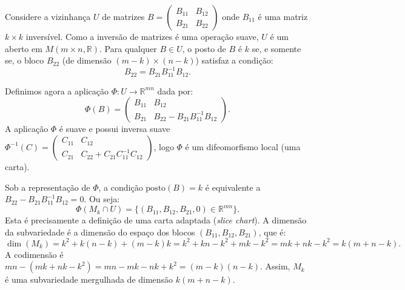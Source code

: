 {	Considere a vizinhança $U$ de matrizes $B = \begin{pmatrix} B_{11} & B_{12} \\ B_{21} & B_{22} \end{pmatrix}$ onde $B_{11}$ é uma matriz $k \times k$ inversível. Como a inversão de matrizes é uma operação suave, $U$ é um aberto em $M(m \times n, \mathbb{R})$. 
	Para qualquer $B \in U$, o posto de $B$ é $k$ se, e somente se, o bloco $B_{22}$ (de dimensão $(m-k) \times (n-k)$) satisfaz a condição:
	\begin{equation*}
		B_{22} = B_{21} B_{11}^{-1} B_{12}.
	\end{equation*}
	
	Definimos agora a aplicação $\Phi : U \to \mathbb{R}^{mn}$ dada por:
	\begin{equation*}
		\Phi(B) = \begin{pmatrix} B_{11} & B_{12} \\ B_{21} & B_{22} - B_{21} B_{11}^{-1} B_{12} \end{pmatrix}.
	\end{equation*}
	A aplicação $\Phi$ é suave e possui inversa suave $\Phi^{-1}(C) = \begin{pmatrix} C_{11} & C_{12} \\ C_{21} & C_{22} + C_{21} C_{11}^{-1} C_{12} \end{pmatrix}$, logo $\Phi$ é um difeomorfismo local (uma carta).
	
	Sob a representação de $\Phi$, a condição $\text{posto}(B) = k$ é equivalente a $B_{22} - B_{21} B_{11}^{-1} B_{12} = 0$. Ou seja:
	\begin{equation*}
		\Phi(M_k \cap U) = \{ (B_{11}, B_{12}, B_{21}, 0) \in \mathbb{R}^{mn} \}.
	\end{equation*}
	Esta é precisamente a definição de uma carta adaptada (\textit{slice chart}). A dimensão da subvariedade é a dimensão do espaço dos blocos $(B_{11}, B_{12}, B_{21})$, que é:
	\begin{equation*}
		\dim(M_k) = k^2 + k(n-k) + (m-k)k = k^2 + kn - k^2 + mk - k^2 = mk + nk - k^2 = k(m+n-k).
	\end{equation*}
	A codimensão é $mn - (mk + nk - k^2) = mn - mk - nk + k^2 = (m-k)(n-k)$. 
	Assim, $M_k$ é uma subvariedade mergulhada de dimensão $k(m+n-k)$.
}


